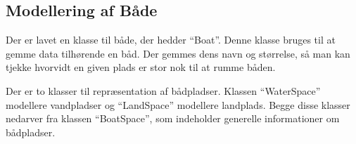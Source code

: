 \subsection{Modellering af Både}
\label{sub:bade}

Der er lavet en klasse til både, der hedder \enquote{Boat}. Denne klasse bruges til at gemme data tilhørende en båd. Der gemmes dens navn og størrelse, så man kan tjekke hvorvidt en given plads er stor nok til at rumme båden.

Der er to klasser til repræsentation af bådpladser. Klassen \enquote{WaterSpace} modellere vandpladser og \enquote{LandSpace} modellere landplads. Begge disse klasser nedarver fra klassen \enquote{BoatSpace}, som indeholder generelle informationer om bådpladser.


